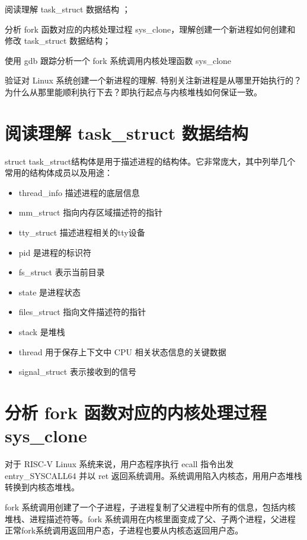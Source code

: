 \documentclass[lang=cn,10pt]{elegantbook}
\begin{document}
\begin{introduction}[实验要求:]
\item 阅读理解 task\_struct 数据结构 ；
\item 分析 fork 函数对应的内核处理过程 sys\_clone，理解创建一个新进程如何创建和修改 task\_struct 数据结构；
\item 使用 gdb 跟踪分析一个 fork 系统调用内核处理函数 sys\_clone
\item 验证对 Linux 系统创建一个新进程的理解. 特别关注新进程是从哪里开始执行的？为什么从那里能顺利执行下去？即执行起点与内核堆栈如何保证一致。  
\end{introduction}



\section{阅读理解 task\_struct 数据结构}
struct task\_struct结构体是用于描述进程的结构体。它非常庞大，其中列举几个常用的结构体成员以及用途：

\begin{itemize}
  \item thread\_info 描述进程的底层信息
  \item mm\_struct 指向内存区域描述符的指针
  \item tty\_struct 描述进程相关的tty设备
  \item pid 是进程的标识符
  \item fs\_struct 表示当前目录
  \item state 是进程状态
  \item files\_struct 指向文件描述符的指针
  \item stack 是堆栈
  \item thread 用于保存上下文中 CPU 相关状态信息的关键数据
  \item signal\_struct 表示接收到的信号
\end{itemize}

\section{分析 fork 函数对应的内核处理过程 sys\_clone}
对于 RISC-V Linux 系统来说，用户态程序执行 ecall 指令出发 entry\_SYSCALL64 并以 ret 返回系统调用。系统调用陷入内核态，用用户态堆栈转换到内核态堆栈。

fork 系统调用创建了一个子进程，子进程复制了父进程中所有的信息，包括内核堆栈、进程描述符等。fork 系统调用在内核里面变成了父、子两个进程，父进程正常fork系统调用返回用户态，子进程也要从内核态返回用户态。
\end{document}
